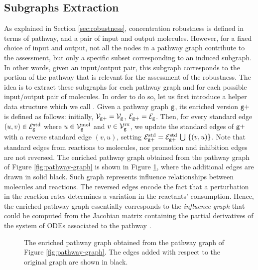 \subsection{Subgraphs Extraction}\label{sec:subgraphs-extraction}
As explained in Section \ref{sec:robustness}, concentration robustness is defined in terms of pathway, and a pair of input and output molecules. However, for a fixed choice of input and output, not all the nodes in a pathway graph contribute to the assessment, but only a specific subset corresponding to an induced subgraph. In other words, given an input/output pair, this subgraph corresponds to the portion of the pathway that is relevant for the assessment of the robustness. The idea is to extract these subgraphs for each pathway graph and for each possible input/output pair of molecules. In order to do so, let us first introduce a helper data structure which we call . Given a pathway graph $\mathtt{g}$, its enriched version $\mathtt{g+}$ is defined as follows: initially, $\Nodes{g+} = \Nodes{g}$, $\Edges{g+} = \Edges{g}$. Then, for every standard edge $(u, v) \in \StdEdges{g}$ where $u \in \MolNodes{g}$ and $v \in \RxNodes{g}$, we update the standard edges of $\mathtt{g+}$ with a reverse standard edge $(v,u)$, setting $\StdEdges{g+} = \StdEdges{g+} \Union \Set{(v, u)}$. Note that standard edges from reactions to molecules, nor promotion and inhibition edges are not reversed. The enriched pathway graph obtained from the pathway graph of Figure \ref{fig:pathway-graph} is shown in Figure \ref{fig:pathway-graph-enriched}, where the additional edges are drawn in solid black. Such graph represents influence relationships between molecules and reactions. The reversed edges encode the fact that a perturbation in the reaction rates determines a variation in the reactants' consumption. Hence, the enriched pathway graph essentially corresponds to the \emph{influence graph} that could be computed from the Jacobian matrix containing the partial derivatives of the system of ODEs associated to the pathway \citep{fages2008influencegraph}.
\begin{figure}[h!]
    \centering
    \resizebox{.6\textwidth}{!}{}
    \caption{The enriched pathway graph obtained from the pathway graph of Figure \ref{fig:pathway-graph}. The edges added with respect to the original graph are shown in black.}
    \label{fig:pathway-graph-enriched}
\end{figure}

